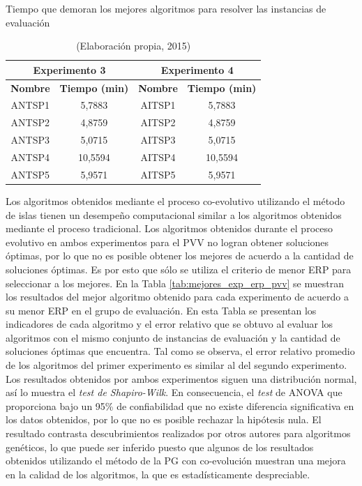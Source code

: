 \begin{table}[hbtp!]
\caption{Tiempo que demoran los mejores algoritmos para resolver las instancias de evaluación}\label{tab:evol_vs_eval_tiempos_exp3_4}
\small
\centering
\begin{center}
\begin{tabular}{cc|cc}
\multicolumn{2}{c|}{{\textbf{Experimento 3}}} & \multicolumn{2}{c}{{\textbf{Experimento 4}}} \\ \hline
{\textbf{Nombre}} & {\textbf{Tiempo (min)}} & {\textbf{Nombre}} & {\textbf{Tiempo (min)}} \\ \hline
ANTSP1 & 5,7883 & AITSP1 & 5,7883 \\
ANTSP2 & 4,8759 & AITSP2 & 4,8759 \\
ANTSP3 & 5,0715 & AITSP3 & 5,0715 \\
ANTSP4 & 10,5594 & AITSP4 & 10,5594 \\
ANTSP5 & 5,9571 & AITSP5 & 5,9571 \\
\hline
\end{tabular}
\end{center}
\caption*{(Elaboración propia, 2015)}
\end{table}

Los algoritmos obtenidos mediante el proceso co-evolutivo utilizando el método de islas tienen un desempeño computacional similar a los algoritmos obtenidos mediante el proceso tradicional. Los algoritmos obtenidos durante el proceso evolutivo en ambos experimentos para el PVV no logran obtener soluciones óptimas, por lo que no es posible obtener los mejores de acuerdo a la cantidad de soluciones óptimas. Es por esto que sólo se utiliza el criterio de menor ERP para seleccionar a los mejores. En la Tabla \ref{tab:mejores_exp_erp_pvv} se muestran los resultados del mejor algoritmo obtenido para cada experimento de acuerdo a su menor ERP en el grupo de evaluación. En esta Tabla se presentan los indicadores de cada algoritmo y el error relativo que se obtuvo al evaluar los algoritmos con el mismo conjunto de instancias de evaluación y la cantidad de soluciones óptimas que encuentra. 
Tal como se observa, el error relativo promedio de los algoritmos del primer experimento es similar al del segundo experimento. Los resultados obtenidos por ambos experimentos siguen una distribución normal, así lo muestra el \textit{test de Shapiro-Wilk}. En consecuencia,  el \textit{test} de ANOVA que proporciona bajo un 95\% de confiabilidad que no existe diferencia significativa en los datos obtenidos, por lo que no es posible rechazar la hipótesis nula. El resultado contrasta descubrimientos realizados por otros autores para algoritmos genéticos, lo que puede ser inferido puesto que algunos de los resultados obtenidos utilizando el método de la PG con co-evolución muestran una mejora en la calidad de los algoritmos, la que es estadísticamente despreciable.

